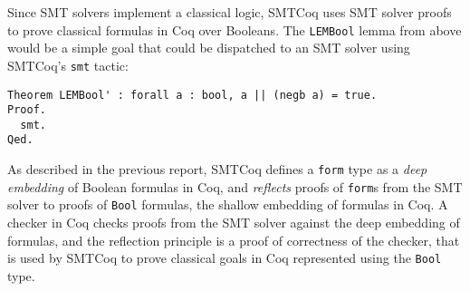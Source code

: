 \documentclass{article}
\begin{document}
	Since SMT solvers implement 
	a classical logic, SMTCoq 
	uses SMT solver proofs to 
	prove classical formulas in 
	Coq over Booleans. The 
	\texttt{LEMBool} lemma from 
	above would be a simple goal that 
	could be dispatched to an SMT 
	solver using SMTCoq's \texttt{smt}
	tactic:
	\begin{verbatim}
Theorem LEMBool' : forall a : bool, a || (negb a) = true.
Proof.
  smt.
Qed.
	\end{verbatim}
	As described in the previous report, 
	SMTCoq defines a \texttt{form} type
	as a \textit{deep embedding} of Boolean 
	formulas in Coq, and \textit{reflects} 
	proofs of \texttt{form}s from the SMT 
	solver to proofs of \texttt{Bool} 
	formulas, 
	the shallow embedding of formulas 
	in Coq. A checker in Coq checks 
	proofs from the SMT solver against
	the deep embedding of formulas, and 
	the reflection principle is a proof
	of correctness of the checker, that 
	is used by SMTCoq to prove classical
	goals in Coq represented using the
	\texttt{Bool} type.
	
	
\end{document}

